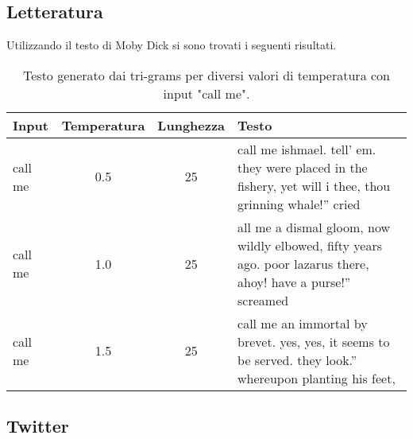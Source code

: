 \subsection{Letteratura}

Utilizzando il testo di Moby Dick si sono trovati i seguenti risultati. 

\begin{table}[h!]
\centering
\begin{tabular}{|l|c|c|p{8cm}|}
\hline
\textbf{Input} & \textbf{Temperatura} & \textbf{Lunghezza} & \textbf{Testo} \\
\hline
call me & 0.5 & 25 & call me ishmael. tell’ em. they were placed in the fishery, yet will i thee, thou grinning whale!” cried \\
\hline
call me & 1.0 & 25 & all me a dismal gloom, now wildly elbowed, fifty years ago. poor lazarus there, ahoy! have a purse!” screamed \\
\hline
call me & 1.5 & 25 & call me an immortal by brevet. yes, yes, it seems to be served. they look.” whereupon planting his feet, \\
\hline
\end{tabular}
\caption{Testo generato dai tri-grams per diversi valori di temperatura con input "call me".}
\end{table}


\subsection{Twitter}

